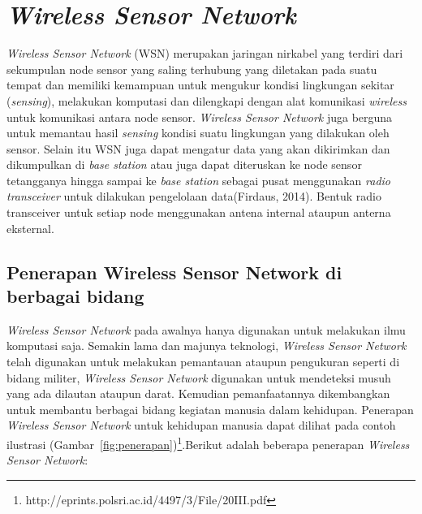 \section{\textit{Wireless Sensor Network} \cite{wsn}} 
\label{}
\textit{Wireless Sensor Network} (WSN) merupakan jaringan nirkabel yang terdiri dari sekumpulan node sensor yang saling terhubung yang diletakan pada suatu tempat dan memiliki kemampuan untuk mengukur kondisi lingkungan sekitar (\textit{sensing}), melakukan komputasi dan dilengkapi  dengan alat komunikasi \textit{wireless} untuk komunikasi antara node sensor. \textit{Wireless Sensor Network} juga berguna untuk memantau hasil \textit{sensing} kondisi suatu lingkungan yang dilakukan oleh sensor. Selain itu WSN juga dapat mengatur data yang akan dikirimkan dan dikumpulkan di \textit{base station} atau juga dapat diteruskan ke node sensor tetangganya hingga sampai ke \textit{base station} sebagai pusat menggunakan \textit{radio transceiver} untuk dilakukan pengelolaan data(Firdaus, 2014). Bentuk radio transceiver untuk setiap node menggunakan antena internal ataupun anterna eksternal.

\subsection{Penerapan Wireless Sensor Network di berbagai bidang}
\textit{Wireless Sensor Network} pada awalnya hanya digunakan untuk melakukan ilmu komputasi saja. Semakin lama dan majunya teknologi, \textit{Wireless Sensor Network} telah digunakan untuk melakukan pemantauan ataupun pengukuran seperti di bidang militer, \textit{Wireless Sensor Network} digunakan untuk mendeteksi musuh yang ada dilautan ataupun darat. Kemudian pemanfaatannya dikembangkan untuk membantu berbagai bidang kegiatan manusia dalam kehidupan. Penerapan \textit{Wireless Sensor Network} untuk kehidupan manusia dapat dilihat pada contoh ilustrasi (Gambar~\ref{fig:penerapan})\footnote{http://eprints.polsri.ac.id/4497/3/File/20III.pdf}.Berikut adalah beberapa penerapan \textit{Wireless Sensor Network}:


